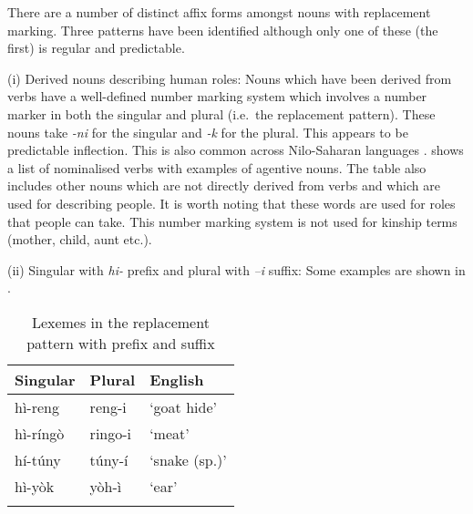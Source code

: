 \documentclass[output=paper]{langsci/langscibook}
\begin{document}
There are a number of distinct affix forms amongst nouns with replacement marking. Three patterns have been identified although only one of these (the first) is regular and predictable.

(i) Derived nouns describing human roles: Nouns which have been derived from verbs have a well-defined number marking system which involves a number marker in both the singular and plural (i.e.\ the replacement pattern). These nouns take \textit{-ni }for the singular and \textit{-k} for the plural. This appears to be predictable inflection. This is also common across Nilo-Saharan languages \citep[243]{Dimmendaal2000}.  shows a list of nominalised verbs with examples of agentive nouns. The table also includes other nouns which are not directly derived from verbs and which are used for describing people. It is worth noting that these words are used for roles that people can take. This number marking system is not used for kinship terms (mother, child, aunt etc.). 

\begin{table}
\caption{Person referent nouns in singular and plural}
\label{tab:moodie:14}
\end{table}

(ii) Singular with \textit{hi-} prefix and plural with \textit{–i} suffix: Some examples are shown in . 

\begin{table}

\begin{tabularx}{.66\textwidth}{XXX}
\lsptoprule

 {Singular} & {Plural} & {English}\\ \midrule
 hì-reng &  reng-i & ‘goat hide’\\
 hì-ríngò &  ringo-i & ‘meat’\\
 hí-túny &  túny-í & ‘snake (sp.)’\\
 hì-yòk &  yòh-ì & ‘ear’\\
\lspbottomrule
\end{tabularx}
\caption{Lexemes in the replacement pattern with prefix and suffix}
\label{tab:moodie:15}
\end{table}
\end{document}
